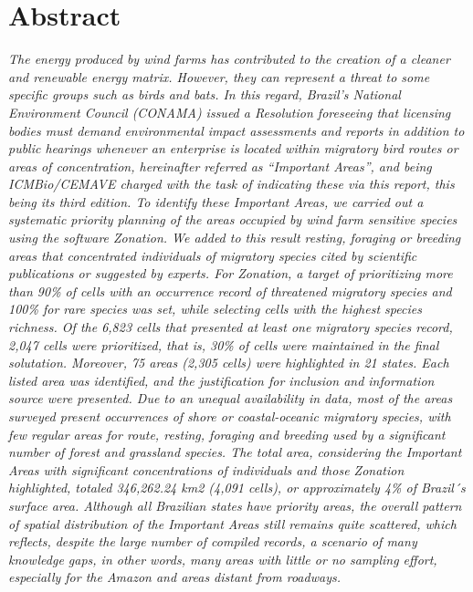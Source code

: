 \documentclass[
  oneside]{scrbook}
\begin{document}
\hypertarget{abstract}{%
\section*{Abstract}\label{abstract}}

\emph{The energy produced by wind farms has contributed to the creation of a cleaner and renewable energy matrix. However, they can represent a threat to some specific groups such as birds and bats. In this regard, Brazil's National Environment Council (CONAMA) issued a Resolution foreseeing that licensing bodies must demand environmental impact assessments and reports in addition to public hearings whenever an enterprise is located within migratory bird routes or areas of concentration, hereinafter referred as ``Important Areas'', and being ICMBio/CEMAVE charged with the task of indicating these via this report, this being its third edition. To identify these Important Areas, we carried out a systematic priority planning of the areas occupied by wind farm sensitive species using the software Zonation. We added to this result resting, foraging or breeding areas that concentrated individuals of migratory species cited by scientific publications or suggested by experts. For Zonation, a target of prioritizing more than 90\% of cells with an occurrence record of threatened migratory species and 100\% for rare species was set, while selecting cells with the highest species richness. Of the 6,823 cells that presented at least one migratory species record, 2,047 cells were prioritized, that is, 30\% of cells were maintained in the final solutation. Moreover, 75 areas (2,305 cells) were highlighted in 21 states. Each listed area was identified, and the justification for inclusion and information source were presented. Due to an unequal availability in data, most of the areas surveyed present occurrences of shore or coastal-oceanic migratory species, with few regular areas for route, resting, foraging and breeding used by a significant number of forest and grassland species. The total area, considering the Important Areas with significant concentrations of individuals and those Zonation highlighted, totaled 346,262.24 km2 (4,091 cells), or approximately 4\% of Brazil´s surface area. Although all Brazilian states have priority areas, the overall pattern of spatial distribution of the Important Areas still remains quite scattered, which reflects, despite the large number of compiled records, a scenario of many knowledge gaps, in other words, many areas with little or no sampling effort, especially for the Amazon and areas distant from roadways.}
\end{document}
